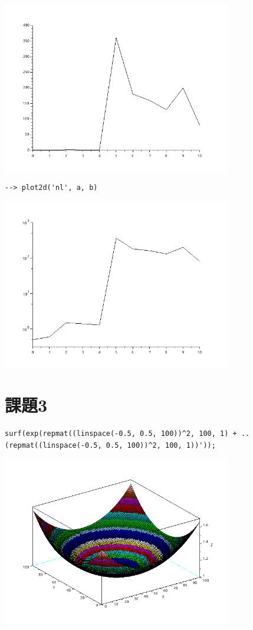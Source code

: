 \documentclass{scrartcl}
\begin{document}
\begin{center}
\includegraphics[width=10cm]{./2-no-kata.png}
\end{center}

\begin{verbatim}
--> plot2d('nl', a, b)
\end{verbatim}
\begin{center}
\includegraphics[width=10cm]{./2-kata.png}
\end{center}
\section{課題3}
\label{sec:org2896e15}
\begin{verbatim}
surf(exp(repmat((linspace(-0.5, 0.5, 100))^2, 100, 1) + ..
(repmat((linspace(-0.5, 0.5, 100))^2, 100, 1))'));
\end{verbatim}
\begin{center}
\includegraphics[width=10cm]{./3.png}
\end{center}
\end{document}
